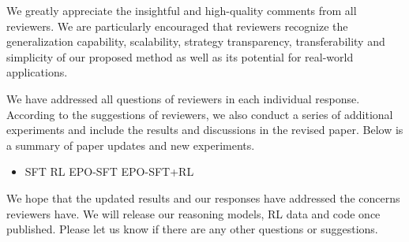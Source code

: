 We greatly appreciate the insightful and high-quality comments from all reviewers. We are particularly encouraged that reviewers recognize the generalization capability, scalability, strategy transparency, transferability and simplicity of our proposed method as well as its potential for real-world applications.

We have addressed all questions of reviewers in each individual response. According to the suggestions of reviewers, we also conduct a series of additional experiments and include the results and discussions in the revised paper. Below is a summary of paper updates and new experiments.
\begin{itemize}
    \item 
SFT
RL
EPO-SFT
EPO-SFT+RL
\end{itemize}

We hope that the updated results and our responses have addressed the concerns reviewers have. We will release our reasoning models, RL data and code once published. Please let us know if there are any other questions or suggestions.



